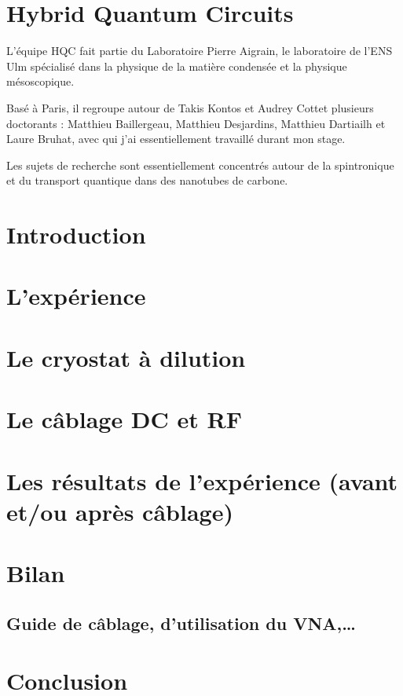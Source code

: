 \documentclass[a4paper,11pt]{report}
\date{}
\title{}
\author{}
\begin{document}
\nocite{*}




\chapter*{Hybrid Quantum Circuits}
L'équipe HQC fait partie du Laboratoire Pierre Aigrain, le laboratoire de l'ENS Ulm spécialisé dans la physique de la matière condensée et la physique mésoscopique.

Basé à Paris, il regroupe autour de Takis Kontos et Audrey Cottet plusieurs doctorants : Matthieu Baillergeau, Matthieu Desjardins, Matthieu Dartiailh et Laure Bruhat, avec qui j'ai essentiellement travaillé durant mon stage.

Les sujets de recherche sont essentiellement concentrés autour de la spintronique et du transport quantique dans des nanotubes de carbone.

\chapter*{Introduction} %


\chapter{L'expérience}


\chapter{Le cryostat à dilution}


\chapter{Le câblage DC et RF}


\chapter{Les résultats de l'expérience (avant et/ou après câblage)}

\chapter{Bilan}
\section{Guide de câblage, d'utilisation du VNA,…}
\chapter*{Conclusion}
%






\end{document}
